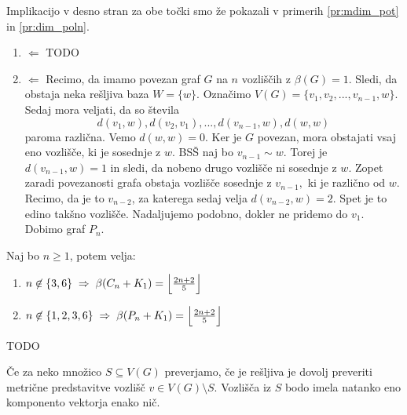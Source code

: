 \documentclass[mat1, tisk]{fmfdelo}
\begin{document}
\begin{dokaz}
    Implikacijo v desno stran za obe točki smo že pokazali v primerih \ref{pr:mdim_pot} in 
    \ref{pr:dim_poln}.
    \begin{enumerate}
        \item $\Leftarrow$  TODO
        \item $\Leftarrow$
        Recimo, da imamo povezan graf $G$ na $n$ vozliščih z $\beta(G) = 1.$ Sledi, da obstaja neka 
        rešljiva baza $W = \{ w \}.$ Označimo $V(G) = \{ v_1, v_2, ... , v_{n-1}, w\}.$ Sedaj mora 
        veljati, da so števila 
        $$ d(v_1, w),  d(v_2, v_1), ..., d(v_{n-1}, w), d(w, w) $$
        paroma različna. Vemo $d(w, w) = 0$. Ker je $G$ povezan, mora obstajati vsaj eno vozlišče, 
        ki je sosednje z $w$. BSŠ naj bo $v_{n-1} \sim w$. Torej je $d(v_{n-1}, w) = 1$ in sledi, 
        da nobeno drugo vozlišče ni sosednje z $w$. Zopet zaradi povezanosti grafa obstaja vozlišče 
        sosednje z $v_{n-1},$ ki je različno od $w$. Recimo, da je to $v_{n-2}$, za katerega sedaj 
        velja $d(v_{n-2}, w) = 2.$ Spet je to edino takšno vozlišče. Nadaljujemo podobno, 
        dokler ne pridemo do $v_1.$ Dobimo graf $P_n.$
    \end{enumerate}
\end{dokaz}


\begin{trditev}
    Naj bo $n\geq 1$, potem velja:
    \begin{enumerate}
        \item $n \not \in \{ 3, 6\} \; \Rightarrow \; \beta(C_n + K_1) = 
        \Bigl \lfloor \frac{2n + 2}{5}\Bigr \rfloor$
        \item $n \not \in \{ 1, 2, 3, 6\} \; \Rightarrow \; \beta(P_n + K_1) = 
        \Bigl \lfloor \frac{2n + 2}{5}\Bigr \rfloor$
    \end{enumerate}
\end{trditev}

\begin{dokaz}
    TODO
\end{dokaz}

\begin{opomba} \label{op:zadostno_preverjanje}
Če za neko množico $S \subseteq V(G)$ preverjamo, če je rešljiva je dovolj preveriti metrične 
predstavitve vozlišč $v \in V(G) \setminus S.$ Vozlišča iz $S$ bodo imela natanko eno komponento 
vektorja enako nič. 
\end{opomba}


\end{document}
